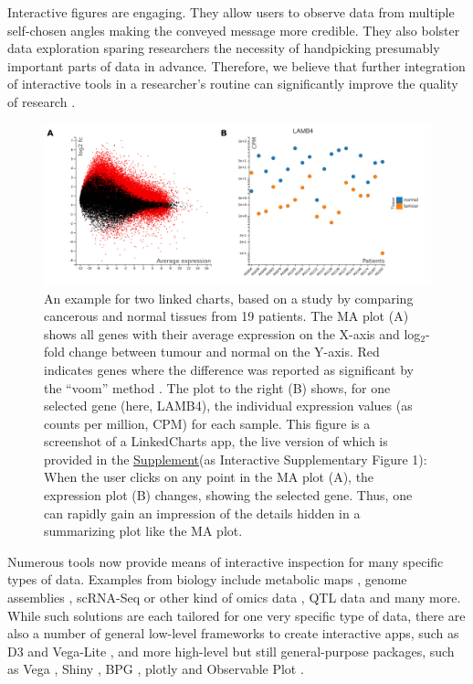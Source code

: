 \documentclass[twocolumn,10pt]{article}
\newcommand{\Supplement}{\href{https://anders-biostat.github.io/lc-paper/}{Supplement}}
\begin{document}
Interactive figures are engaging. They allow users to observe data from multiple self-chosen angles making the conveyed message more credible. They also bolster data exploration sparing researchers the necessity of handpicking presumably important parts of data in advance. Therefore, we believe that further integration of interactive tools in a researcher's routine can significantly improve the quality of research \citep{shander_2016, yuk_2014}.

\begin{figure}
   \includegraphics[width=\textwidth]{FigD/figD.png}
   \caption{An example for two linked charts, based on a study by \citet{conway_2015} comparing cancerous and normal tissues from 19 patients. The MA plot (A) shows all genes with their average expression on the X-axis and log$_2$-fold change between tumour and normal on the Y-axis. Red indicates genes where the difference was reported as significant by the ``voom'' method \citep{law_2014}. The plot to the right (B) shows, for one selected gene (here, LAMB4), the individual expression values (as counts per million, CPM) for each sample. This figure is a screenshot of a LinkedCharts app, the live version of which is provided in the \Supplement (as Interactive Supplementary Figure 1): When the user clicks on any point in the MA plot (A), the expression plot (B) changes, showing the selected gene. Thus, one can rapidly gain an impression of the details hidden in a summarizing plot like the MA plot.}  
   \label{FigD}
\end{figure}

Numerous tools \citep{caldarola_2017} now provide means of interactive inspection for many specific types of data. Examples from biology include metabolic maps \citep{noronha_2017}, genome assemblies \citep{wick_2015}, scRNA-Seq or other kind of omics data \citep{hillje_2020, rue_2018}, QTL data \citep{broman_2015} and many more. While such solutions are each tailored for one very specific type of data, there are also a number of general low-level frameworks to create interactive apps, such as D3 \citep{bostock_2011} and Vega-Lite \citep{satyanarayan_2015}, and more high-level but still general-purpose packages, such as Vega \citep{satyanarayan_2016}, Shiny \citep{shiny}, BPG \citep{p_2019}, plotly \citep{sievert_2019, sievert_2020} and Observable Plot \citep{observable_2023}.
\end{document}
